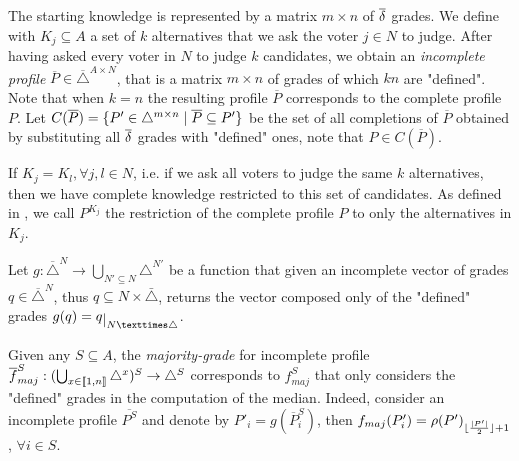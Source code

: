 \documentclass[version=3.21, pagesize, twoside=off, bibliography=totoc, DIV=calc, fontsize=12pt, a4paper]{scrartcl}
\begin{document}
The starting knowledge is represented by a matrix $m\times n$ of $\overline{\delta}$ grades.  We define with $K_j \subseteq A$ a set of $k$ alternatives that we ask the voter $j\in N$ to judge. 
After having asked every voter in $N$ to judge $k$ candidates, we obtain an \emph{incomplete profile} $\overline{P}\in \overline{\triangle}^{A \times N}$, that is a matrix $m \times n$ of grades of which $kn$ are "defined".
Note that when $k=n$ the resulting profile $\overline{P}$ corresponds to the complete profile $P$. Let $C(\overline{P}) = \{P' \in \triangle^{m \times n} \suchthat \overline{P} \subseteq P'\}$ be the set of all completions of $\overline{P}$ obtained by substituting all $\overline{\delta}$ grades with "defined" ones, note that $P \in C(\overline{P})$.
 
If $K_j=K_l, \forall j,l\in N$, i.e. if we ask all voters to judge the same $k$ alternatives, then we have complete knowledge restricted to this set of candidates. As defined in , we call $P^{K_j}$ the restriction of the complete profile $P$ to only the alternatives in $K_j$.

Let $g:\overline{\triangle}^N\rightarrow \bigcup_{N' \subseteq N}\triangle^{N'}$ be a function that given an incomplete vector of grades $q \in \overline{\triangle}^N$, thus $q \subseteq N × \bar{\triangle}$, returns the vector composed only of the "defined" grades $g(q) = \restr{q}{N × \triangle}$.


Given any $S \subseteq A$, the \emph{majority-grade} for incomplete profile $\overline{f}^S_{maj}: (\bigcup_{x \in \llbracket1,n\rrbracket}\triangle^{x})^S \rightarrow \triangle^S$ corresponds to $f^S_{maj}$ that only considers the "defined" grades in the computation of the median. Indeed, consider an incomplete profile $\overline{P^S}$ and denote by $P'_i=g(\overline{P}^S_i)$, then ${f}_{maj}(P'_i) = \rho(P')_{\lfloor\frac{\lvert P'\rvert}{2}\rfloor + 1}$, $\forall i \in S$.
\end{document}
